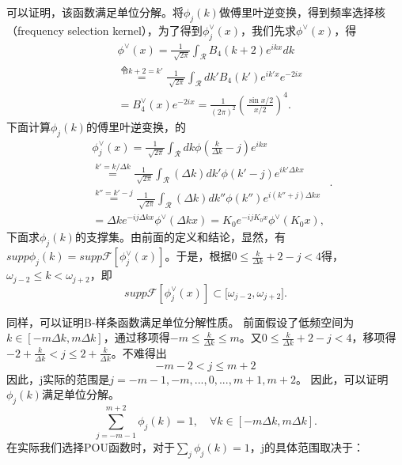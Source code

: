 可以证明，该函数满足单位分解。将$\phi_j(k)$做傅里叶逆变换，得到频率选择核（frequency selection kernel），为了得到$\phi_{j}^{\vee}(x)$，我们先求$\phi^{\vee}(x)$，得
\begin{equation}
    \begin{aligned} 
        &\phi^{\vee}(x) =\frac{1}{\sqrt[]{2\pi } }\int_{\mathcal{R} }^{}  B_4(k+2)e^{ikx}dk \\
      &\overset{令k+2=k'}{=} \frac{1}{\sqrt[]{2\pi } }\int_{\mathcal{R} }^{}dk'B_4(k')e^{ik'x}e^{-2ix}\\
      &=B_4^{\vee } (x)e^{-2ix}=\frac{1}{(2\pi)^2}(\frac{\sin{x/2}}{x/2})^4 .
      \end{aligned}
\end{equation}
下面计算$\phi_j(k)$的傅里叶逆变换，的
\begin{equation}
    \begin{aligned} 
        & \phi_{j}^{\vee}(x)=\frac{1}{\sqrt[]{2\pi } }\int_{\mathcal{R} }^{}dk\phi(\frac{k}{\Delta k}-j )e^{ikx}  \\
       &\overset{k'=k/\Delta k}{=}\frac{1}{\sqrt[]{2\pi } }\int_{\mathcal{R} }^{}  (\Delta k)dk'\phi (k'-j)e^{ik'\Delta kx}  \\
       &\overset{k''=k'-j}{=}\frac{1}{\sqrt[]{2\pi } }\int_{\mathcal{R} }^{}  (\Delta k)dk''\phi (k'')e^{i(k''+j)\Delta kx}\\
       &=\Delta ke^{-ij\Delta kx}\phi^{\vee}(\Delta kx)=K_0e^{-ijK_{0}x}
       \phi^{\vee}(K_{0}x),
       \end{aligned}.
\end{equation}
下面求$\phi_{j}(k)$的支撑集。由前面的定义和结论，显然，有$supp\phi _j(k)=supp\mathcal{F}[\phi_{j}^{\vee}(x)]$。于是，根据$0\le \frac{k}{\Delta k}+2-j<4$得，$\omega_{j-2}\le k<\omega_{j+2}$，即
\begin{equation}
    supp\mathcal{F}[\phi_{j}^{\vee}(x)]\subset\lbrack\omega_{j-2}, \omega_{j+2}].
\end{equation}

同样，可以证明B-样条函数满足单位分解性质。
前面假设了低频空间为$k\in [-m\Delta k,m\Delta k]$，通过移项得$-m\le \frac{k}{\Delta k}\le m$。又$0\le \frac{k}{\Delta k}+2-j<4$，移项得$-2+\frac{k}{\Delta k}<j\le 2+\frac{k}{\Delta k}$。不难得出
\begin{equation*}
    -m-2<j\le m+2
\end{equation*}
因此，j实际的范围是$j = -m-1,-m,...,0,...,m+1,m+2$。
因此，可以证明$\phi_{j}(k)$满足单位分解。
\begin{equation}\label{eq:sum1C4}
  \sum_{j=-m-1}^{m+2}\phi_j(k) = 1 ,\quad \forall k\in [-m\Delta k, m\Delta k].
\end{equation}
在实际我们选择POU函数时，对于$\sum_{j}^{}\phi_j(k) = 1$，j的具体范围取决于：

